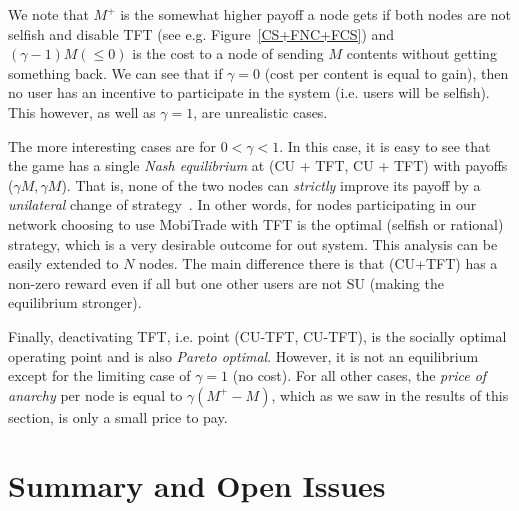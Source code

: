 We note that $M^{+}$ is the somewhat higher payoff a node gets if both nodes are not selfish and disable TFT (see e.g. Figure~\ref{CS+FNC+FCS}) and $(\gamma - 1)M (\le 0)$ is the cost to a node of sending $M$ contents without getting something back. We can see that if $\gamma = 0$ (cost per content is equal to gain), then no user has an incentive to participate in the system (i.e. users will be selfish). This however, as well as $\gamma = 1$, are unrealistic cases.

The more interesting cases are for $0 < \gamma < 1$. In this case, it is easy to see that the game has a single \emph{Nash equilibrium} at (CU + TFT, CU + TFT) with payoffs ($\gamma M, \gamma M$). That is, none of the two nodes can \emph{strictly} improve its payoff by a \emph{unilateral} change of strategy~\cite{game}. In other words, for nodes participating in our network choosing to use MobiTrade with TFT is the optimal (selfish or rational) strategy, which is a very desirable outcome for out system. This analysis can be easily extended to $N$ nodes. The main difference there is that (CU+TFT) has a non-zero reward even if all but one other users are not SU (making the equilibrium stronger).

Finally, deactivating TFT, i.e. point (CU-TFT, CU-TFT), is the socially optimal operating point and is also \emph{Pareto optimal}. However, it is not an equilibrium except for the limiting case of $\gamma = 1$ (no cost). For all other cases, the \emph{price of anarchy} per node is equal to $\gamma (M^{+} - M)$, which as we saw in the results of this section, is only a small price to pay.

\section{Summary and Open Issues}